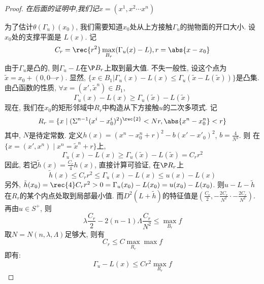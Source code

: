 \begin{proof}
    \textit{在后面的证明中,我们记$x=(x^1,x^2\cdots x^n)$}
    \par 为了估计$\theta(\Gamma_u)(x_0)$, 我们需要知道$x_0$处从上方接触$\Gamma_u$的抛物面的开口大小.  设$x_0$处的支撑平面是 $L(x)$.  记
    \begin{equation}
        C_r=\rec{r^2}\max_{B_r}(\Gamma_u(x)-L), r=\abs{x-x_0}
    \end{equation}
    由于$\Gamma_u$是凸的, 则$\Gamma_u-L$在$\P B_r$上取到最大值.  不失一般性, 设这个点为$\tilde{x}=x_0+(0, 0\cdots r)$.  显然, $\{x \in B_1 | \Gamma_u(x) - L({x}) \le \Gamma_u(\tilde{x}-L(\tilde{x}))\}$是凸集.  由凸函数的性质, $\forall x=(x', \tilde{x}^n) \in B_1$, 
    \begin{equation}
        \Gamma_u(x)-L(x) \ge \Gamma_u(\tilde{x})-L(\tilde{x})
    \end{equation}
    现在, 我们在$x_0$的矩形邻域中$R_r$中构造从下方接触$u$的二次多项式.  记
    \begin{equation}
        R_r=\{x \mid (\Sigma^{n-1}(x^i-x_0^i)^2)^\rec{2} < Nr, \abs{x^n-x_0^n} <r\}
    \end{equation}
    其中, $N$是待定常数.  
    定义$h(x)=(x^n-x_0^n+r)^2-b(x'-x'_0)^2$, $b=\frac{4}{N^2}$.  则 在$\{x=(x', x^n)\mid x^n=\tilde{x}^n+r\}$上, 
    \begin{equation}
        \Gamma_u(x)-L(x) \ge \Gamma_u(\tilde{x})-L(\tilde{x})=C_rr^2
    \end{equation}
    因此, 若记$\tilde{h}(x)=\frac{C_r}{4}h(x)$, 直接计算可验证, 在$\P R_r$上
    \begin{equation}
        \tilde{h}(x) \le C_rr^2 \le \Gamma_u(x)-L(x) \le u(x)-L(x)
    \end{equation}
    另外, $\tilde{h}(x_0)=\rec{4}C_rr^2 >0 = \Gamma_u(x_0)-L(x_0)=u(x_0)-L(x_0)$.  
    则$u-L-\tilde{h}$在$R_r$的某个内点处取到局部最小值.  而$D^2(L+\tilde{h})$的特征值是$(\frac{C_r}{2}, -\frac{2C_r}{N^2}\cdot -\frac{2C_r}{N^2})$.  再由$u \in S^+$, 则
    \begin{equation}
        \lambda\frac{C_r}{2}-2(n-1)\Lambda \frac{C_r}{N^2} \le \max_{B_r}f
    \end{equation}
    取$N=N(n,\lambda,\Lambda)$足够大, 则有
    \begin{equation}
        C_r \le C\max_{R_r}\max f
    \end{equation}
    即有: 
    \begin{equation} \label{eqstar}
        \Gamma_u-L(x) \le Cr^2\max_{R_r}f
    \end{equation}

\end{proof}
